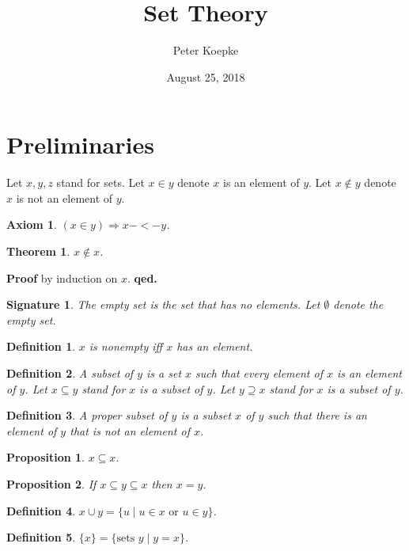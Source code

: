 \documentclass{article}
\newenvironment{forthel}{\begin{leftbar}}{\end{leftbar}}
\newtheorem{axiom}{Axiom}
\newtheorem{theorem}{Theorem}
\newtheorem{definition}{Definition}
\newtheorem{signature}{Signature}
\newtheorem{proposition}{Proposition}
\begin{document}
\title{Set Theory}

\author{Peter Koepke}

\date{August 25, 2018}

\maketitle


\section{Preliminaries}

\begin{forthel}
Let $x,y,z$ stand for sets.
Let $x \in y$ denote $x$ is an element of $y$.
Let $x \notin y$ denote $x$ is not an element of $y$.

\begin{axiom} $(x \in y) \Rightarrow x -<- y$.
\end{axiom} 

\begin{theorem} $x \notin x$.
\end{theorem}
{\bf Proof} by induction on $x$. {\bf qed.}

\begin{signature} The \emph{empty set} is the set that has no elements.
Let $\emptyset$ denote the empty set.
\end{signature}

\begin{definition} $x$ is \emph{nonempty} iff $x$ has an element.
\end{definition}

\begin{definition} A subset of $y$ is a set $x$ such that every element 
of $x$ is an element of $y$. 
Let $x \subseteq y$ stand for $x$ is a subset of $y$.
Let $y \supseteq x$ stand for $x$ is a subset of $y$.
\end{definition}

\begin{definition} A \emph{proper subset} of $y$ is a subset $x$ of $y$ such that there is an element of $y$ that is not an element of $x$.
\end{definition}

\begin{proposition} $x \subseteq x$. \end{proposition}

\begin{proposition} If $x \subseteq y \subseteq x$ then $x = y$. \end{proposition}

\begin{definition} $x \cup y = \{u \mid u \in x \text{ or } u \in y\}$. \end{definition}

\begin{definition} $\{x\} = \{\text{sets }y \mid y = x\}$.\end{definition}
\end{forthel}
\end{document}
